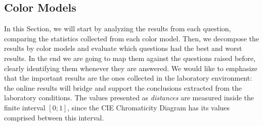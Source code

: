 \subsection{Color Models}
\label{subsec:results_colormodels}
%
In this Section, we will start by analyzing the results from each question, comparing the statistics collected from each color model. Then, we decompose the results by color models and evaluate which questions
had the best and worst results. In the end we are going to map them against the questions raised before, clearly identifying them whenever they are answered. We would like
to emphasize that the important results are the ones collected in the laboratory environment: the online results will bridge and support the conclusions extracted from the laboratory conditions. The values presented as \emph{distances}
are measured inside the finite interval $[0 ; 1]$, since the CIE Chromaticity Diagram has its values comprised between this interval. \par
%

